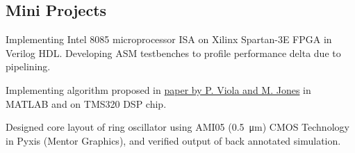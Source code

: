 \documentclass[]{deedy}
\begin{document}
\begin{minipage}[t]{0.69\textwidth}
\begin{flushleft}
\section{Mini Projects}
%
\vspace{1.1pt}
\begin{tightemize}
\item Implementing Intel 8085 microprocessor ISA on Xilinx Spartan-3E FPGA in Verilog HDL. Developing ASM testbenches to profile performance delta due to pipelining.
\end{tightemize}
\sectionsep
%
\vspace{1.1pt}
\begin{tightemize}
\item Implementing algorithm proposed in \href{https://www.cs.cmu.edu/~efros/courses/LBMV07/Papers/viola-cvpr-01.pdf}{paper by P. Viola and M. Jones} in MATLAB and on TMS320 DSP chip.
\end{tightemize}
\sectionsep
%
\vspace{1.1pt}
\begin{tightemize}
\item Designed core layout of ring oscillator using AMI05 (\SI{0.5}{\micro\metre}) CMOS Technology in Pyxis (Mentor Graphics), and verified output of back annotated simulation.
\end{tightemize}
\sectionsep
%

\end{flushleft}
\end{minipage}
\end{document}
